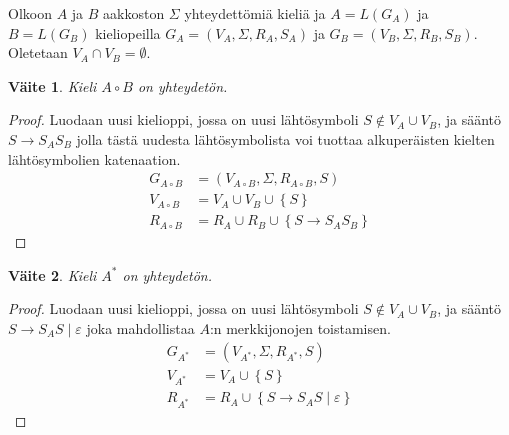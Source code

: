 \documentclass[a4paper,11pt]{article}
\newtheorem*{claim}{Väite}
\newcommand{\set}[1]{{\left\{ #1 \right\}}}
\begin{document}
\begin{enumerate}
  Olkoon $A$ ja $B$ aakkoston $\Sigma$ yhteydettömiä kieliä ja $A =
  L(G_A)$ ja $B = L(G_B)$ kieliopeilla $G_A = (V_A, \Sigma, R_A, S_A)$
  ja $G_B = (V_B, \Sigma, R_B, S_B)$. Oletetaan $V_A \cap V_B =
  \emptyset$.
  \begin{claim}
    Kieli $A \circ B$ on yhteydetön.
  \end{claim}
  \begin{proof}
    Luodaan uusi kielioppi, jossa on uusi lähtösymboli $S \notin V_A
    \cup V_B$, ja sääntö $S \to S_AS_B$ jolla tästä uudesta
    lähtösymbolista voi tuottaa alkuperäisten kielten lähtösymbolien
    katenaation.
    \begin{align*}
      G_{A \circ B} & = (V_{A \circ B}, \Sigma, R_{A \circ B}, S) \\
      V_{A \circ B} & = V_A \cup V_B \cup \set{S} \\
      R_{A \circ B} & = R_A \cup R_B \cup \set{S \to S_AS_B}
    \end{align*}
  \end{proof}
  \begin{claim}
    Kieli $A^*$ on yhteydetön.
  \end{claim}
  \begin{proof}
    Luodaan uusi kielioppi, jossa on uusi lähtösymboli $S \notin V_A
    \cup V_B$, ja sääntö $S \to S_AS \mid \varepsilon$ joka
    mahdollistaa $A$:n merkkijonojen toistamisen.
    \begin{align*}
      G_{A^*} & = (V_{A^*}, \Sigma, R_{A^*}, S) \\
      V_{A^*} & = V_A \cup \set{S} \\
      R_{A^*} & = R_A \cup \set{S \to S_AS \mid \varepsilon}
    \end{align*}
  \end{proof}


\end{enumerate}
\end{document}
